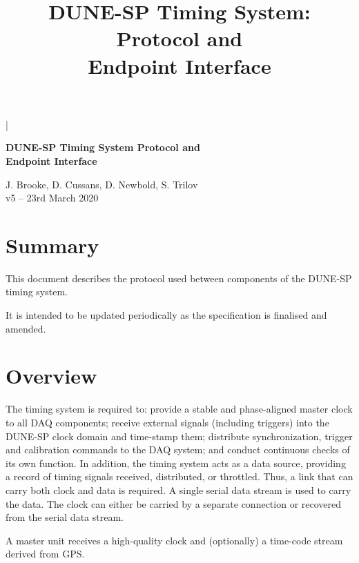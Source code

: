 \documentclass{dune}
\begin{document}

\lstMakeShortInline[columns=fixed]|

\title{DUNE-SP Timing System: Protocol and\\ Endpoint Interface}
\begin{center}
{\LARGE\bf DUNE-SP Timing System Protocol and\\ Endpoint Interface}
\vspace{1cm}

J. Brooke, D. Cussans, D. Newbold, S. Trilov \\
\vspace*{1ex}
v5 -- 23rd March 2020
\end{center}
\vspace*{\fill}
\setcounter{tocdepth}{1}
\tableofcontents
\vspace*{\fill}

\section*{Summary}

This document describes the protocol used between components of the DUNE-SP timing system. 

It is intended to be updated periodically as the specification is finalised and amended.

\newpage
\section{Overview}

The timing system is required to: provide a stable and phase-aligned
master clock to all DAQ components; receive external signals (including triggers)
into the DUNE-SP clock domain and time-stamp them; distribute synchronization,
trigger and calibration commands to the DAQ system; and conduct continuous
checks of its own function. In addition, the timing system acts as a
data source, providing a record of timing signals received, distributed, or
throttled. Thus, a link that can carry both clock and data is required. A single serial data stream is used to carry the data. The clock can either be carried by a separate connection or recovered from the serial data stream.

A master unit receives a high-quality clock and (optionally) a time-code stream derived from GPS. 
\end{document}
